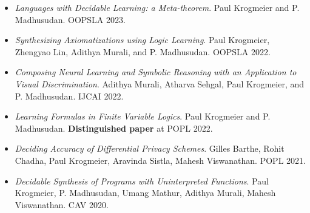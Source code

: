 \documentclass[12pt,a4paper,sans]{moderncv}        %
\newcommand{\MYhref}[3][assassinblue]{\href{#2}{\color{#1}{#3}}}%
\begin{document}
\vspace{4pt}
\begin{itemize}
\item \emph{Languages with Decidable Learning: a Meta-theorem}. Paul
  Krogmeier and P. Madhusudan. OOPSLA 2023. \MYhref{https://paulkrog.github.io/papers/MetaTheorem.pdf}{preprint}  \vspace{10pt}
\item \emph{Synthesizing Axiomatizations using Logic Learning}. Paul
  Krogmeier, Zhengyao Lin, Adithya Murali, and P. Madhusudan. OOPSLA
  2022. \MYhref{https://dl.acm.org/doi/pdf/10.1145/3563348}{paper}
  \vspace{10pt}
\item \emph{Composing Neural Learning and Symbolic Reasoning with an
    Application to Visual Discrimination}. Adithya Murali, Atharva
  Sehgal, Paul Krogmeier, and P. Madhusudan. IJCAI 2022. \MYhref{https://doi.org/10.24963/ijcai.2022/466}{paper}
  \vspace{10pt}
\item \emph{Learning Formulas in Finite Variable Logics}. Paul
  Krogmeier and P. Madhusudan. \textbf{Distinguished paper} at POPL 2022. \MYhref{https://doi.org/10.1145/3498671}{paper}
  \vspace{10pt}
\item \emph{Deciding Accuracy of Differential Privacy
    Schemes}. Gilles Barthe, Rohit Chadha, Paul Krogmeier, Aravinda
  Sistla, Mahesh Viswanathan. POPL 2021. \MYhref{https://dl.acm.org/doi/abs/10.1145/3434289}{paper}
  \vspace{10pt}
\item \emph{Decidable Synthesis of Programs with Uninterpreted
    Functions}.  Paul Krogmeier, P. Madhusudan, Umang Mathur, Adithya
  Murali, Mahesh Viswanathan. CAV
  2020. \MYhref{https://paper.springer.com/chapter/10.1007/978-3-030-53291-8_32}{paper}
  \vspace{10pt}

\end{itemize}
\end{document}
